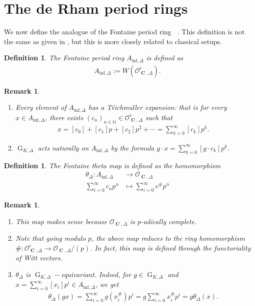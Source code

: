 \documentclass{amsart}
\newtheorem{remark}[proposition]{Remark}
\newtheorem{definition}[proposition]{Definition}
\newcommand{\mAinf}{A_{\mathrm{inf},\Delta}}
\DeclareMathOperator{\Ainf}{A_{inf}}
\DeclareMathOperator{\C}{\textbf{C}}
\DeclareMathOperator{\G}{G}
\begin{document}
\section{The de Rham period rings}

We now define the analogue of the Fontaine period ring $\Ainf$. This definition is not the same as given in \cite{BCM}, but this is more closely related to classical setups.

\begin{definition}
    The \emph{Fontaine period ring} $\mAinf$ is defined as
    \begin{align*}
        \mAinf:=W(\mathcal{O}^\flat_{\C,\Delta}).
    \end{align*}
\end{definition}

\begin{remark}
    \begin{enumerate}
        \item[(i)]  Every element of $\mAinf$ has a T\'eichmuller expansion: that is for every $x\in\mAinf$, there exists $(c_n)_{n\in\mathbb{N}}\in\mathcal{O}^\flat_{\C,\Delta}$ such that
        \begin{align*}
          x=[c_0]+[c_1]p+[c_2]p^2+\cdots=\sum\limits_{k=0}^\infty[c_k]p^k.
        \end{align*}
        \item[(ii)] $\G_{K,\Delta}$ acts naturally on $\mAinf$ by the formula $g\cdot x=\sum\limits_{k=0}^\infty[g\cdot c_k]p^k$.
    \end{enumerate}
   
\end{remark}

\begin{definition}
    The \emph{Fontaine theta map} is defined as the homomorphism
    \begin{align*}
      \theta_\Delta:  \mAinf&\to \mathcal{O}_{\C,\Delta}\\
        \sum\limits_{i=0}^\infty c_n p^n&\mapsto \sum\limits_{i=0}^\infty c^\#p^n
    \end{align*}
\end{definition}

\begin{remark}
    \begin{enumerate}
        \item[(i)] This map makes sense because $\mathcal{O}_{\C,\Delta}$ is $p$-adically complete.
        \item[(ii)] Note that going modulo $p$, the above map reduces to the ring homomorphism $\#:\mathcal{O}^\flat_{\C,\Delta}\to \mathcal{O}_{\C,\Delta}/(p)$. In fact, this map is defined through the functoriality of Witt vectors.
        \item[(iii)] $\theta_\Delta$ is $\G_{K,\Delta}-$equivariant. Indeed, for $g\in\G_{K,\Delta}$ and $x=\sum\limits_{i=0}^\infty[x_i]p^i\in\mAinf$, we get
      \begin{align*}
          \theta_\Delta(gx)=\sum\limits_{i=0}^\infty g(x^\#_i)p^i=g\sum\limits_{i=0}^\infty x^\#_ip^i=g\theta_\Delta(x).
      \end{align*}
    \end{enumerate}
\end{remark}
\end{document}
